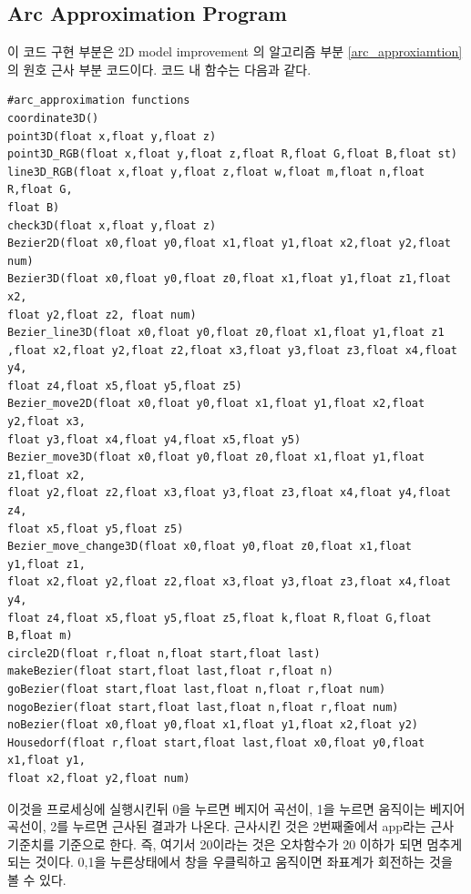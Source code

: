\documentclass{gshs_thesis}
\theoremstyle{theorem}
\theoremstyle{lemma}
\theoremstyle{definition}
\begin{document}
\subsection{Arc Approximation Program}
이 코드 구현 부분은 2D model improvement 의 알고리즘 부분 \cref{arc_approxiamtion}의 원호 근사 부분 코드이다. 코드 내 함수는 다음과 같다.
\begin{verbatim}
#arc_approximation functions
coordinate3D()
point3D(float x,float y,float z)
point3D_RGB(float x,float y,float z,float R,float G,float B,float st)
line3D_RGB(float x,float y,float z,float w,float m,float n,float R,float G,
float B)
check3D(float x,float y,float z)
Bezier2D(float x0,float y0,float x1,float y1,float x2,float y2,float num)
Bezier3D(float x0,float y0,float z0,float x1,float y1,float z1,float x2,
float y2,float z2, float num)
Bezier_line3D(float x0,float y0,float z0,float x1,float y1,float z1
,float x2,float y2,float z2,float x3,float y3,float z3,float x4,float y4,
float z4,float x5,float y5,float z5)
Bezier_move2D(float x0,float y0,float x1,float y1,float x2,float y2,float x3,
float y3,float x4,float y4,float x5,float y5)
Bezier_move3D(float x0,float y0,float z0,float x1,float y1,float z1,float x2,
float y2,float z2,float x3,float y3,float z3,float x4,float y4,float z4,
float x5,float y5,float z5)
Bezier_move_change3D(float x0,float y0,float z0,float x1,float y1,float z1,
float x2,float y2,float z2,float x3,float y3,float z3,float x4,float y4,
float z4,float x5,float y5,float z5,float k,float R,float G,float B,float m)
circle2D(float r,float n,float start,float last)
makeBezier(float start,float last,float r,float n)
goBezier(float start,float last,float n,float r,float num)
nogoBezier(float start,float last,float n,float r,float num)
noBezier(float x0,float y0,float x1,float y1,float x2,float y2)
Housedorf(float r,float start,float last,float x0,float y0,float x1,float y1,
float x2,float y2,float num)
\end{verbatim}
이것을 프로세싱에 실행시킨뒤 0을 누르면 베지어 곡선이, 1을 누르면 움직이는 베지어 곡선이, 2를 누르면 근사된 결과가 나온다. 근사시킨 것은 2번째줄에서 app라는 근사 기준치를 기준으로 한다. 즉, 여기서 20이라는 것은 오차함수가 20 이하가 되면 멈추게 되는 것이다. 
0,1을 누른상태에서 창을 우클릭하고 움직이면 좌표계가 회전하는 것을 볼 수 있다.
\begin{multicols}{2}

\end{multicols}
\end{document}
